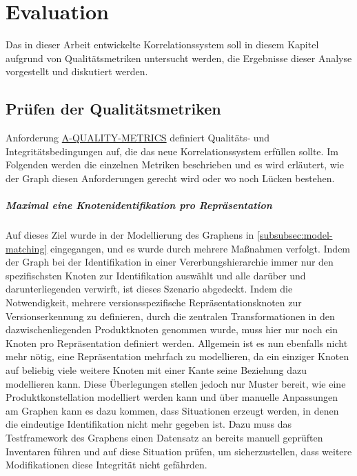 \chapter{Evaluation}\label{ch:evaluation}

Das in dieser Arbeit entwickelte Korrelationssystem soll in diesem Kapitel aufgrund von Qualitätsmetriken untersucht werden, die Ergebnisse dieser Analyse vorgestellt und diskutiert werden.


\section{Prüfen der Qualitätsmetriken}

Anforderung \hyperref[subsec:req-graph-inner-consistency]{A-QUALITY-METRICS} definiert Qualitäts‑ und Integritätsbedingungen auf, die das neue Korrelationssystem erfüllen sollte.
Im Folgenden werden die einzelnen Metriken beschrieben und es wird erläutert, wie der Graph diesen Anforderungen gerecht wird oder wo noch Lücken bestehen.

\paragraph{Maximal eine Knotenidentifikation pro Repräsentation}
Auf dieses Ziel wurde in der Modellierung des Graphens in \autoref{subsubsec:model-matching} eingegangen, und es wurde durch mehrere Maßnahmen verfolgt.
Indem der Graph bei der Identifikation in einer Vererbungshierarchie immer nur den spezifischsten Knoten zur Identifikation auswählt und alle darüber und darunterliegenden verwirft, ist dieses Szenario abgedeckt.
Indem die Notwendigkeit, mehrere versionsspezifische Repräsentationsknoten zur Versionserkennung zu definieren, durch die zentralen Transformationen in den dazwischenliegenden Produktknoten genommen wurde, muss hier nur noch ein Knoten pro Repräsentation definiert werden.
Allgemein ist es nun ebenfalls nicht mehr nötig, eine Repräsentation mehrfach zu modellieren, da ein einziger Knoten auf beliebig viele weitere Knoten mit einer Kante seine Beziehung dazu modellieren kann.
Diese Überlegungen stellen jedoch nur Muster bereit, wie eine Produktkonstellation modelliert werden kann und über manuelle Anpassungen am Graphen kann es dazu kommen, dass Situationen erzeugt werden, in denen die eindeutige Identifikation nicht mehr gegeben ist.
Dazu muss das Testframework des Graphens einen Datensatz an bereits manuell geprüften Inventaren führen und auf diese Situation prüfen, um sicherzustellen, dass weitere Modifikationen diese Integrität nicht gefährden.

